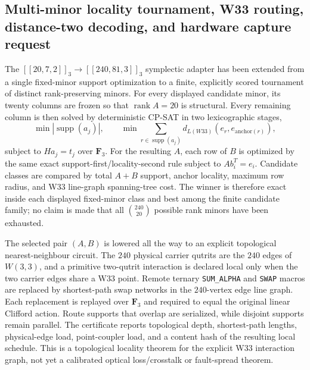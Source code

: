 \subsection{Multi-minor locality tournament, W33 routing, distance-two decoding, and hardware capture request}

The $[[20,7,2]]_3\to[[240,81,3]]_3$ symplectic adapter has been extended from a
single fixed-minor support optimization to a finite, explicitly scored tournament
of distinct rank-preserving minors.  For every displayed candidate minor, its
twenty columns are frozen so that $\operatorname{rank}A=20$ is structural.  Every
remaining column is then solved by deterministic CP-SAT in two lexicographic
stages,
\[
  \min |\operatorname{supp}(a_j)|,
  \qquad
  \min\sum_{r\in\operatorname{supp}(a_j)}d_{L(W33)}(e_r,e_{\mathrm{anchor}(r)}),
\]
subject to $Ha_j=t_j$ over $\mathbf F_3$.  For the resulting $A$, each row of
$B$ is optimized by the same exact support-first/locality-second rule subject to
$Ab_i^T=e_i$.  Candidate classes are compared by total $A+B$ support, anchor
locality, maximum row radius, and W33 line-graph spanning-tree cost.  The winner
is therefore exact inside each displayed fixed-minor class and best among the
finite candidate family; no claim is made that all $\binom{240}{20}$ possible
rank minors have been exhausted.

The selected pair $(A,B)$ is lowered all the way to an explicit topological
nearest-neighbour circuit.  The $240$ physical carrier qutrits are the $240$
edges of $W(3,3)$, and a primitive two-qutrit interaction is declared local only
when the two carrier edges share a W33 point.  Remote ternary
\texttt{SUM\_ALPHA} and \texttt{SWAP} macros are replaced by shortest-path swap
networks in the $240$-vertex edge line graph.  Each replacement is replayed over
$\mathbf F_3$ and required to equal the original linear Clifford action.  Route
supports that overlap are serialized, while disjoint supports remain parallel.
The certificate reports topological depth, shortest-path lengths, physical-edge
load, point-coupler load, and a content hash of the resulting local schedule.
This is a topological locality theorem for the explicit W33 interaction graph,
not yet a calibrated optical loss/crosstalk or fault-spread theorem.

